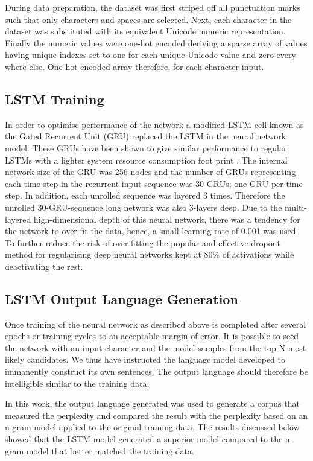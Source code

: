\documentclass[a4paper]{article}
\begin{document}
During data preparation, the dataset was first striped off all punctuation marks such that only characters and spaces are selected.  Next, each character in the dataset was substituted with its equivalent Unicode numeric representation. Finally the numeric values were one-hot encoded deriving a sparse array of values having unique indexes set to one for each unique Unicode value and zero every where else. One-hot encoded array therefore, for each character input.

\subsection{LSTM Training}

In order to optimise performance of the network a modified LSTM cell known as the Gated Recurrent Unit (GRU) replaced the LSTM in the neural network model.  These GRUs have been shown to give similar performance to regular LSTMs with a lighter system resource consumption foot print \cite{cho2014learning}. The internal network size of the GRU was 256 nodes and the number of GRUs representing each time step in the recurrent input sequence was 30 GRUs; one GRU per time step. In addition, each unrolled sequence was layered 3 times.  Therefore the unrolled 30-GRU-sequence long network was also 3-layers deep. Due to the multi-layered high-dimensional depth of this neural network, there was a tendency for the network to over fit the data, hence, a small learning rate of 0.001 was used. To further reduce the risk of over fitting the popular and effective dropout method for regularising deep neural networks kept at 80\% of activations while deactivating the rest.

\subsection{LSTM Output Language Generation}
Once training of the neural network as described above is completed after several epochs or training cycles to an acceptable margin of error. It is possible to seed the network with an input character and the model samples from the top-N most likely candidates.  We thus have instructed the language model developed to immanently construct its own sentences.  The output language should therefore be intelligible similar to the training data. 

In this work, the output language generated was used to generate a corpus that measured the perplexity and compared the result with the perplexity based on an n-gram model applied to the original training data.  The results discussed below showed that the LSTM model generated a superior model compared to the n-gram model that better matched the training data.
\end{document}
